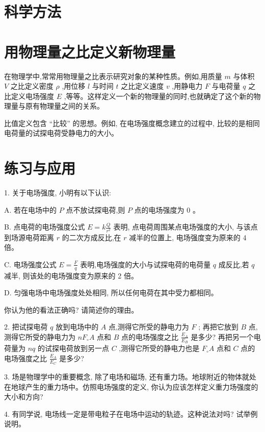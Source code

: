 \documentclass[10pt]{article}
\begin{document}
\section*{科学方法}

\section*{用物理量之比定义新物理量}

在物理学中,常常用物理量之比表示研究对象的某种性质。例如,用质量 \(m\) 与体积 \(V\) 之比定义密度 \(\rho\) ,用位移 \(l\) 与时间 \(t\) 之比定义速度 \(v\) ,用静电力 \(F\) 与电荷量 \(q\) 之比定义电场强度 \(E\) ,等等。这样定义一个新的物理量的同时,也就确定了这个新的物理量与原有物理量之间的关系。

比值定义包含 “比较” 的思想。例如, 在电场强度概念建立的过程中, 比较的是相同电荷量的试探电荷受静电力的大小。

\section*{练习与应用}

1. 关于电场强度, 小明有以下认识:

A. 若在电场中的 \(P\) 点不放试探电荷,则 \(P\) 点的电场强度为 0 。

B. 点电荷的电场强度公式 \(E = k\frac{Q}{{r}^{2}}\) 表明, 点电荷周围某点电场强度的大小, 与该点到场源电荷距离 \(r\) 的二次方成反比,在 \(r\) 减半的位置上, 电场强度变为原来的 4 倍。

C. 电场强度公式 \(E = \frac{F}{q}\) 表明,电场强度的大小与试探电荷的电荷量 \(q\) 成反比,若 \(q\) 减半, 则该处的电场强度变为原来的 2 倍。

D. 匀强电场中电场强度处处相同, 所以任何电荷在其中受力都相同。

你认为他的看法正确吗? 请简述你的理由。

2. 把试探电荷 \(q\) 放到电场中的 \(A\) 点,测得它所受的静电力为 \(F\) ; 再把它放到 \(B\) 点,测得它所受的静电力为 \(n{F}_{ \circ }A\) 点和 \(B\) 点的电场强度之比 \(\frac{{E}_{A}}{{E}_{B}}\) 是多少? 再把另一个电荷量为 \({nq}\) 的试探电荷放到另一点 \(C\) ,测得它所受的静电力也是 \({F}_{ \circ }A\) 点和 \(C\) 点的电场强度之比 \(\frac{{E}_{A}}{{E}_{C}}\) 是多少?

3. 场是物理学中的重要概念, 除了电场和磁场, 还有重力场。地球附近的物体就处在地球产生的重力场中。仿照电场强度的定义, 你认为应该怎样定义重力场强度的大小和方向?

4. 有同学说, 电场线一定是带电粒子在电场中运动的轨迹。这种说法对吗? 试举例说明。
\end{document}
